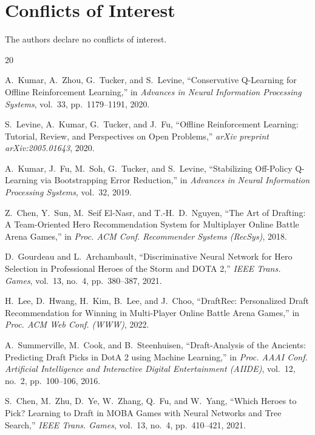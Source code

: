 \documentclass[journal]{IEEEtran}
\begin{document}
\section*{Conflicts of Interest}

The authors declare no conflicts of interest.

\begin{thebibliography}{20}

A.~Kumar, A.~Zhou, G.~Tucker, and S.~Levine, ``Conservative Q-Learning for Offline Reinforcement Learning,'' in \textit{Advances in Neural Information Processing Systems}, vol.~33, pp.~1179--1191, 2020.

S.~Levine, A.~Kumar, G.~Tucker, and J.~Fu, ``Offline Reinforcement Learning: Tutorial, Review, and Perspectives on Open Problems,'' \textit{arXiv preprint arXiv:2005.01643}, 2020.

A.~Kumar, J.~Fu, M.~Soh, G.~Tucker, and S.~Levine, ``Stabilizing Off-Policy Q-Learning via Bootstrapping Error Reduction,'' in \textit{Advances in Neural Information Processing Systems}, vol.~32, 2019.

Z.~Chen, Y.~Sun, M.~Seif El-Nasr, and T.-H.~D.~Nguyen, ``The Art of Drafting: A Team-Oriented Hero Recommendation System for Multiplayer Online Battle Arena Games,'' in \textit{Proc. ACM Conf. Recommender Systems (RecSys)}, 2018.

D.~Gourdeau and L.~Archambault, ``Discriminative Neural Network for Hero Selection in Professional Heroes of the Storm and DOTA 2,'' \textit{IEEE Trans. Games}, vol.~13, no.~4, pp.~380--387, 2021.

H.~Lee, D.~Hwang, H.~Kim, B.~Lee, and J.~Choo, ``DraftRec: Personalized Draft Recommendation for Winning in Multi-Player Online Battle Arena Games,'' in \textit{Proc. ACM Web Conf. (WWW)}, 2022.

A.~Summerville, M.~Cook, and B.~Steenhuisen, ``Draft-Analysis of the Ancients: Predicting Draft Picks in DotA 2 using Machine Learning,'' in \textit{Proc. AAAI Conf. Artificial Intelligence and Interactive Digital Entertainment (AIIDE)}, vol.~12, no.~2, pp.~100--106, 2016.

S.~Chen, M.~Zhu, D.~Ye, W.~Zhang, Q.~Fu, and W.~Yang, ``Which Heroes to Pick? Learning to Draft in MOBA Games with Neural Networks and Tree Search,'' \textit{IEEE Trans. Games}, vol.~13, no.~4, pp.~410--421, 2021.


\end{thebibliography}
\end{document}
